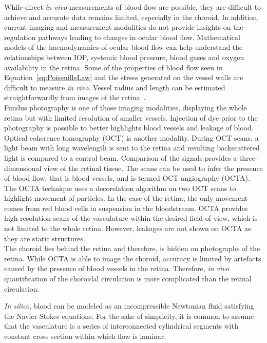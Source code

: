 \documentclass[12pt,a4paper]{journal}
\begin{document}
While direct \textit{in vivo} measurements of blood flow are possible, they are difficult to achieve and accurate data remains limited, especially in the choroid.
In addition, current imaging and measurement modalities do not provide insights on the regulation pathways leading to changes in ocular blood flow.
Mathematical models of the haemodynamics of ocular blood flow can help understand the relationships between IOP, systemic blood pressure, blood gases and oxygen availability in the retina.
Some of the properties of blood flow seen in Equation~\ref{eq:PoiseuilleLaw} and the stress generated on the vessel walls are difficult to measure \textit{in vivo}.
Vessel radius and length can be estimated straightforwardly from images of the retina~\cite{DoblhoffDier_2014}.\\
Fundus photography is one of those imaging modalities, displaying the whole retina but with limited resolution of smaller vessels.
Injection of dye prior to the photography is possible to better highlights blood vessels and leakage of blood.\\
Optical coherence tomography (OCT) is another modality.
During OCT scans, a light beam with long wavelength is sent to the retina and resulting backscattered light is compared to a control beam.
Comparison of the signals provides a three-dimensional view of the retinal tissue.
The scans can be used to infer the presence of blood flow, that is blood vessels, and is termed OCT angiography (OCTA).
The OCTA technique uses a decorelation algorithm on two OCT scans to highlight movement of particles.
In the case of the retina, the only movement comes from red blood cells in suspension in the bloodstream.
OCTA provides high resolution scans of the vasculature within the desired field of view, which is not limited to the whole retina.
However, leakages are not shown on OCTA as they are static structures.\\
The choroid lies behind the retina and therefore, is hidden on photographs of the retina.
While OCTA is able to image the choroid, accuracy is limited by artefacts caused by the presence of blood vessels in the retina.
Therefore, \textit{in vivo} quantification of the choroidal circulation is more complicated than the retinal circulation.

\textit{In silico}, blood can be modeled as an incompressible Newtonian fluid satisfying the Navier-Stokes equations.
For the sake of simplicity, it is common to assume that the vasculature is a series of interconnected cylindrical segments with constant cross section within which flow is laminar.
\end{document}
